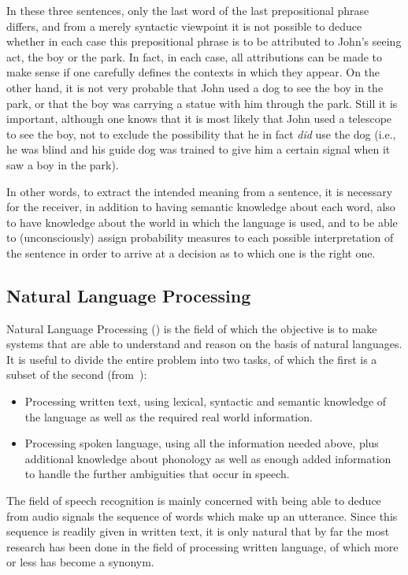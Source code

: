 In these three sentences, only the last word of the last prepositional
phrase differs, and from a merely syntactic viewpoint it is not
possible to deduce whether in each case this prepositional phrase is
to be attributed to John's seeing act, the boy or the park. In fact,
in each case, all attributions can be made to make sense if one
carefully defines the contexts in which they appear. On the other
hand, it is not very probable that John used a dog to see the boy in
the park, or that the boy was carrying a statue with him through the
park. Still it is important, although one knows that it is most likely
that John used a telescope to see the boy, not to exclude the
possibility that he in fact {\em did\/} use the dog (i.e., he was
blind and his guide dog was trained to give him a certain signal when
it saw a boy in the park).

In other words, to extract the intended meaning from a sentence, it is
necessary for the receiver, in addition to having semantic knowledge
about each word, also to have knowledge about the world in which the
language is used, and to be able to (unconsciously) assign probability
measures to each possible interpretation of the sentence in order to
arrive at a decision as to which one is the right one.

\subsection{Natural Language Processing}
\label{nlpr}

Natural Language Processing ({\nlp}) is the field of which the
objective is to make systems that are able to understand and reason on
the basis of natural languages. It is useful to divide the entire
{\nlp} problem into two tasks, of which the first is a subset of the
second (from~\cite{rich}):

\begin{itemize}
  \item Processing written text, using lexical, syntactic and semantic
    knowledge of the language as well as the required real world
    information. 
  \item Processing spoken language, using all the information needed
    above, plus additional knowledge about phonology as well as enough
    added information to handle the further ambiguities that occur in
    speech.
\end{itemize}

The field of speech recognition is mainly concerned with being able to
deduce from audio signals the sequence of words which make up an
utterance. Since this sequence is readily given in written text, it is
only natural that by far the most research has been done in the field
of processing written language, of which {\nlp} more or less has
become a synonym.

